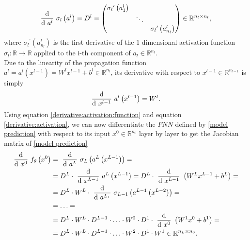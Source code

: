 \begin{equation}
    \label{derivative:activation:function}
    \frac{\textup{d}}{\textup{d} \ a^{l}} \ \sigma_{l} \left(a^l\right) = D^{l} = \begin{pmatrix} {\sigma_{l}}^{\prime} \left( a^{l}_1 \right) & & \\ & \ddots & \\ & & {\sigma_{l}}^{\prime} \left( a^{l}_{n_l} \right) \end{pmatrix} \in \mathbb{R}^{n_l \times n_l}, 
\end{equation}
where ${\sigma_{l}}^{\prime} \left( a^{l}_{n_l} \right)$ is the first derivative of the 1-dimensional activation function $\sigma_{l} \colon \mathbb{R} \to \mathbb{R}$ applied to the i-th component of $a_l \in \mathbb{R}^{n_l}$. \\
Due to the linearity of the propagation function $a^l = a^l\left(x^{l-1}\right) = W^{l} x^{l-1} + b^{l} \in \mathbb{R}^{n_l}$, its derivative with respect to $x^{l-1} \in \mathbb{R}^{n_{l-1}}$ is simply
\begin{equation}
    \label{derivative:activation}
    \frac{\textup{d}}{\textup{d} \ x^{l-1}} \ a^{l}\left(x^{l-1}\right) = W^l.
\end{equation}
Using equation \cref{derivative:activation:function} and equation \cref{derivative:activation}, we can now differentiate the $FNN$ defined by \cref{model prediction} with respect to its input $x^0 \in \mathbb{R}^{n_0}$ layer by layer to get the Jacobian matrix of \cref{model prediction}
\begin{equation} 
    \label{first order derivative}
    \begin{aligned}
        \frac{\textup{d}}{\textup{d} \ x^0} \  f_{\theta}\left(x^0\right) & =\ \frac{\textup{d}}{\textup{d} \ a^{L}} \ \sigma_{L} \left(a^{L}\left(x^{L-1}\right)\right) = \\
        & = D^L \cdot\ \frac{\textup{d}}{\textup{d} \ x^{L-1}} \ a^{L}\left(x^{L-1}\right) = D^L \cdot\ \frac{\textup{d}}{\textup{d} \ x^{L-1}} \ \left(W^{L} x^{L-1} + b^{L}\right) = \\
        & = D^L \cdot W^L \cdot\ \frac{\textup{d}}{\textup{d} \ a^{L_1}} \ \sigma_{L-1} \left(a^{L-1}\left(x^{L-2}\right)\right) = \\
        & = \ldots = \\
        & = D^L \cdot W^L \cdot D^{L-1} \cdot \ldots \cdot W^2 \cdot D^1 \cdot\ \frac{\textup{d}}{\textup{d} \ x^{0}} \ \left(W^{1} x^{0} + b^{1}\right) = \\
        & = D^L \cdot W^L \cdot D^{L-1} \cdot \ldots \cdot W^2 \cdot D^1 \cdot W^{1} \in \mathbb{R}^{n_L \times n_0}.
    \end{aligned} 
\end{equation} 

